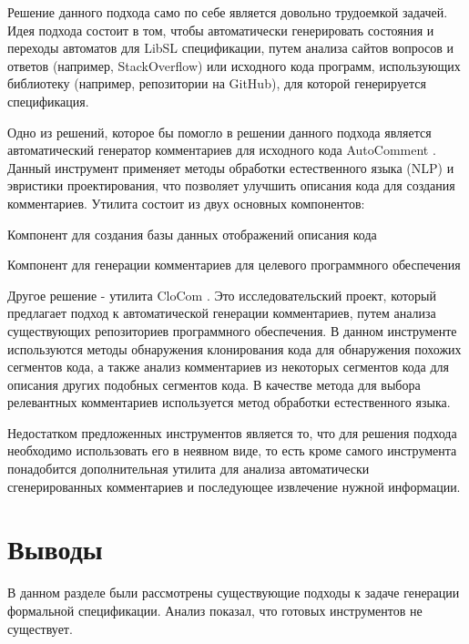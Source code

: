 Решение данного подхода само по себе является довольно трудоемкой задачей. Идея подхода состоит в том, чтобы автоматически генерировать  состояния и переходы автоматов для LibSL спецификации, путем анализа сайтов вопросов и ответов (например, StackOverflow) или исходного кода программ, использующих библиотеку (например, репозитории на GitHub), для которой генерируется спецификация.

Одно из решений, которое бы помогло в решении данного подхода является автоматический генератор комментариев для исходного кода AutoComment \cite{AutoComment}.
Данный инструмент применяет методы обработки естественного языка (NLP) и эвристики проектирования, что позволяет улучшить описания кода для создания комментариев.
Утилита состоит из двух основных компонентов:
%
\begin{itemize*}
\item Компонент для создания базы данных отображений описания кода
\item Компонент для генерации комментариев для целевого программного обеспечения
\end{itemize*}
%

Другое решение - утилита CloCom \cite{CloCom}. Это исследовательский проект, который предлагает подход к автоматической генерации комментариев, путем анализа существующих репозиториев программного обеспечения.
В данном инструменте используются методы обнаружения клонирования кода для обнаружения похожих сегментов кода, а также анализ комментариев из некоторых сегментов кода для описания других подобных сегментов кода.
В качестве метода для выбора релевантных комментариев используется метод обработки естественного языка.

Недостатком предложенных инструментов является то, что для решения подхода необходимо использовать его в неявном виде, то есть кроме самого инструмента понадобится дополнительная утилита для анализа автоматически сгенерированных комментариев и последующее извлечение нужной информации.


\section{Выводы}

В данном разделе были рассмотрены существующие подходы к задаче генерации формальной спецификации.
Анализ показал, что готовых инструментов не существует.